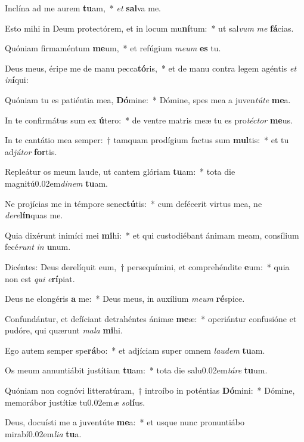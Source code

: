 \item Inclína ad me aurem \textbf{tu}am,~* \textit{et} \textbf{sal}va me.
\item Esto mihi in Deum prote\-ctórem, et in locum mu\textbf{ní}tum:~* ut sal\textit{vum} \textit{me} \textbf{fá}cias.
\item Quóniam firmaméntum \textbf{me}um,~* et refúgium \textit{meum} \textbf{es} tu.
\item Deus meus, éripe me de manu pecca\textbf{tó}ris,~* et de manu contra legem agéntis \textit{et} \textit{in}\textbf{í}qui:
\item Quóniam tu es patiéntia mea, \textbf{Dó}mine:~* Dómine, spes mea a juven\textit{túte} \textbf{me}a.
\item In te confirmátus sum ex \textbf{ú}tero:~* de ventre matris meæ tu es pro\textit{téctor} \textbf{me}us.
\item In te cantátio mea semper:~† tamquam prodígium factus sum \textbf{mul}tis:~* et tu ad\textit{jútor} \textbf{for}tis.
\item Repleátur os meum laude, ut cantem glóriam \textbf{tu}am:~* tota die magnitú\kern 0.02em\textit{dinem} \textbf{tu}am.
\item Ne projícias me in témpore sene\textbf{ctú}tis:~* cum defécerit virtus mea, ne \textit{dere}\textbf{lín}quas me.
\item Quia dixérunt inimíci mei \textbf{mi}hi:~* et qui custodiébant ánimam meam, consílium fecé\textit{runt} \textit{in} \textbf{u}num.
\item Dicéntes: Deus derelíquit eum,~† persequímini, et comprehéndite \textbf{e}um:~* quia non est \textit{qui} \textit{e}\textbf{rí}piat.
\item Deus ne elongéris \textbf{a} me:~* Deus meus, in auxílium \textit{meum} \textbf{ré}spice.
\item Confundántur, et defíciant detrahéntes ánimæ \textbf{me}æ:~* operiántur confusióne et pudóre, qui quærunt \textit{mala} \textbf{mi}hi.
\item Ego autem semper spe\textbf{rá}bo:~* et adjíciam super omnem \textit{laudem} \textbf{tu}am.
\item Os meum annuntiábit justítiam \textbf{tu}am:~* tota die salu\kern 0.02em\textit{táre} \textbf{tu}um.
\item Quóniam non cognóvi litteratúram,~† introíbo in poténtias \textbf{Dó}mini:~* Dómine, memorábor justítiæ tu\kern 0.02em\textit{æ} \textit{so}\textbf{lí}us.
\item Deus, docuísti me a juventúte \textbf{me}a:~* et usque nunc pronuntiábo mirabí\kern 0.02em\textit{lia} \textbf{tu}a.

